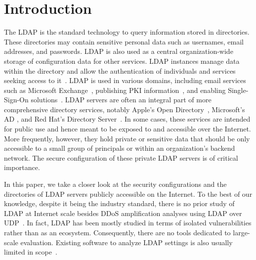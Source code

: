 \section{Introduction}
The \acrfull{LDAP} is the standard technology to query information stored in directories. These directories may contain sensitive personal data such as usernames, email addresses, and passwords. LDAP is also used as a central organization-wide storage of configuration data for other services. 
\acrshort{LDAP} instances manage data within the directory and allow the authentication of individuals and services seeking access to it~\cite{rfc4511}. \acrshort{LDAP} is used in various domains, including email services~\cite{carterLDAPSystemAdministration2003, rhotonProgrammerGuideInternet1999} such as Microsoft Exchange~\cite{ExchangeAccountServer}, publishing \gls{PKI} information~\cite{karatsiolisPlanningDirectoryServices2005a}, and enabling Single-Sign-On solutions~\cite{wangResearchDesignUnified2017, huApplicationSingleSignon2010}.
\acrshort{LDAP} servers are often an integral part of more comprehensive directory services,  notably Apple's Open Directory~\cite{AppleOpenDirectory2005}, Microsoft's \acrfull{AD} \cite{janicerickettsLDAPAuthenticationAzure2023, deland-hanEnableLightweightDirectory2023}, and Red Hat's Directory Server~\cite{AdministrationGuideRed}. In some cases, these services are intended for public use and hence meant to be exposed to and accessible over the Internet. 
More frequently, however, they hold private or sensitive data that should be only accessible to a small group of principals or within an organization's backend network. The secure configuration of these private \acrshort{LDAP} servers is of critical importance. 

In this paper, we take a closer look at the security configurations and the directories of \acrshort{LDAP} servers publicly accessible on the Internet. To the best of our knowledge, despite it being the industry standard, there is no prior study of LDAP at Internet scale besides DDoS amplification analyses using LDAP over UDP~\cite{ldap-ddos}. In fact, \acrshort{LDAP} has been mostly studied in terms of isolated vulnerabilities rather than as an ecosystem. Consequently, there are no tools dedicated to large-scale evaluation. Existing software to analyze \acrshort{LDAP} settings is also usually limited in scope~\cite{ldappershellster,synzackldapper,metasploit}.

